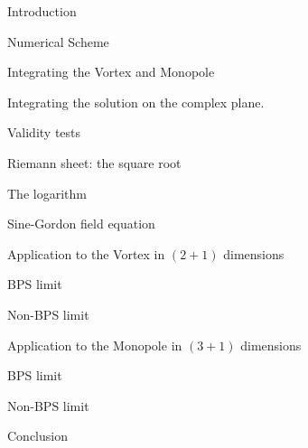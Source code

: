 \begin{subsection}{Introduction}

\end{subsection}
\begin{subsection}{Numerical Scheme}
  \begin{subsection}{Integrating the Vortex and Monopole}
    
  \end{subsection}
  \begin{subsection}{Integrating the solution on the complex plane.}
    
  \end{subsection}
\end{subsection}
\begin{subsection}{Validity tests}
  \begin{subsubsection}{Riemann sheet: the square root}
    
  \end{subsubsection}
  \begin{subsubsection}{The logarithm}
    
  \end{subsubsection}
  \begin{subsubsection}{Sine-Gordon field equation}
    
  \end{subsubsection}
\end{subsection}
\begin{subsection}{Application to the Vortex in $(2+1)$ dimensions}
  \begin{subsubsection}{BPS limit}
    
  \end{subsubsection}
  \begin{subsubsection}{Non-BPS limit}
    
  \end{subsubsection}
\end{subsection}

\begin{subsection}{Application to the Monopole in $(3+1)$ dimensions}
  \begin{subsubsection}{BPS limit}
    
  \end{subsubsection}
  \begin{subsubsection}{Non-BPS limit}
    
  \end{subsubsection}
\end{subsection}

\begin{subsection}{Conclusion}
  
\end{subsection}

